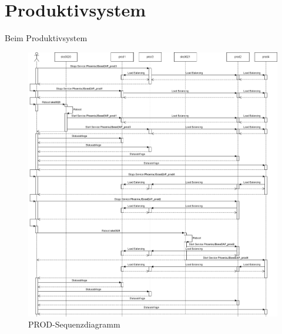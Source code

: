 
\chapter{Produktivsystem}
\begin{flushleft}
    Beim Produktivsystem
    \begin{figure}[H]
        \centering
        \includegraphics[width=1\linewidth]{source/prod/sequenzdiagramm_prod}
        \caption{PROD-Sequenzdiagramm}
        \label{fig:prod-sequenzdiagramm}
    \end{figure}
\end{flushleft}